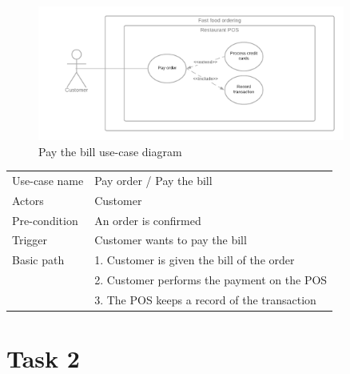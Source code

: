 \documentclass[a4paper]{article}
\numberwithin{equation}{section}
\begin{document}
\begin{figure}[H]
  \centering
  \includegraphics[width=0.9\textwidth]{./assets/t1/PayOrder.png}
  \caption{Pay the bill use-case diagram}
\end{figure}

\begin{center}
  \begin{tabular}{*{2}{l}}
    \toprule
    Use-case name & Pay order / Pay the bill                     \\
    Actors        & Customer                                     \\
    Pre-condition & An order is confirmed                        \\
    Trigger       & Customer wants to pay the bill               \\
    Basic path    & 1. Customer is given the bill of the order   \\
                  & 2. Customer performs the payment on the POS  \\
                  & 3. The POS keeps a record of the transaction \\
    \bottomrule
  \end{tabular}
\end{center}

\newpage

\section{Task 2}
\end{document}
